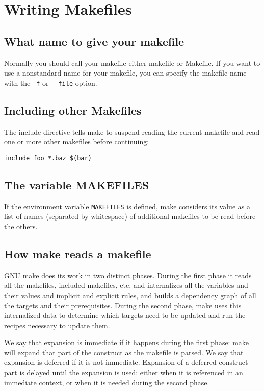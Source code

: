 %

\section{Writing Makefiles}
\subsection{What name to give your makefile}
Normally you should call your makefile either makefile or Makefile.
If you want to use a nonstandard name for your makefile, you can specify the makefile name with the \texttt{-f} or \texttt{-{}-file} option. 

\subsection{Including other Makefiles}
The include directive tells make to suspend reading the current makefile and read one or more other makefiles before continuing:

\begin{verbatim}
include foo *.baz $(bar)
\end{verbatim}

\subsection{The variable MAKEFILES}
If the environment variable \texttt{MAKEFILES} is defined, make considers its value as a list of names (separated by whitespace) of additional makefiles to be read before the others.

\subsection{How make reads a makefile}
GNU make does its work in two distinct phases. During the first phase it reads all the makefiles, included makefiles, etc. and internalizes all the variables and their values and implicit and explicit rules, and builds a dependency graph of all the targets and their prerequisites. During the second phase, make uses this internalized data to determine which targets need to be updated and run the recipes necessary to update them.

We say that expansion is immediate if it happens during the first phase: make will expand that part of the construct as the makefile is parsed. We say that expansion is deferred if it is not immediate. Expansion of a deferred construct part is delayed until the expansion is used: either when it is referenced in an immediate context, or when it is needed during the second phase.

